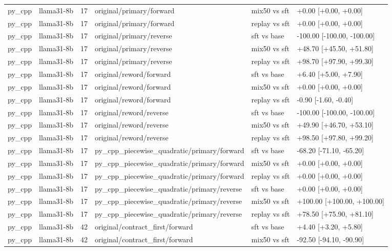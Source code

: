 \begin{table}[t]
\begin{tabular}{llllll}
py\_cpp & llama31-8b & 17 & original/primary/forward & mix50 vs sft & +0.00 [+0.00, +0.00] \\
py\_cpp & llama31-8b & 17 & original/primary/forward & replay vs sft & +0.00 [+0.00, +0.00] \\
py\_cpp & llama31-8b & 17 & original/primary/reverse & sft vs base & -100.00 [-100.00, -100.00] \\
py\_cpp & llama31-8b & 17 & original/primary/reverse & mix50 vs sft & +48.70 [+45.50, +51.80] \\
py\_cpp & llama31-8b & 17 & original/primary/reverse & replay vs sft & +98.70 [+97.90, +99.30] \\
py\_cpp & llama31-8b & 17 & original/reword/forward & sft vs base & +6.40 [+5.00, +7.90] \\
py\_cpp & llama31-8b & 17 & original/reword/forward & mix50 vs sft & +0.00 [+0.00, +0.00] \\
py\_cpp & llama31-8b & 17 & original/reword/forward & replay vs sft & -0.90 [-1.60, -0.40] \\
py\_cpp & llama31-8b & 17 & original/reword/reverse & sft vs base & -100.00 [-100.00, -100.00] \\
py\_cpp & llama31-8b & 17 & original/reword/reverse & mix50 vs sft & +49.90 [+46.70, +53.10] \\
py\_cpp & llama31-8b & 17 & original/reword/reverse & replay vs sft & +98.50 [+97.80, +99.20] \\
py\_cpp & llama31-8b & 17 & py\_cpp\_piecewise\_quadratic/primary/forward & sft vs base & -68.20 [-71.10, -65.20] \\
py\_cpp & llama31-8b & 17 & py\_cpp\_piecewise\_quadratic/primary/forward & mix50 vs sft & +0.00 [+0.00, +0.00] \\
py\_cpp & llama31-8b & 17 & py\_cpp\_piecewise\_quadratic/primary/forward & replay vs sft & +0.00 [+0.00, +0.00] \\
py\_cpp & llama31-8b & 17 & py\_cpp\_piecewise\_quadratic/primary/reverse & sft vs base & +0.00 [+0.00, +0.00] \\
py\_cpp & llama31-8b & 17 & py\_cpp\_piecewise\_quadratic/primary/reverse & mix50 vs sft & +100.00 [+100.00, +100.00] \\
py\_cpp & llama31-8b & 17 & py\_cpp\_piecewise\_quadratic/primary/reverse & replay vs sft & +78.50 [+75.90, +81.10] \\
py\_cpp & llama31-8b & 42 & original/contract\_first/forward & sft vs base & +4.40 [+3.20, +5.80] \\
py\_cpp & llama31-8b & 42 & original/contract\_first/forward & mix50 vs sft & -92.50 [-94.10, -90.90] \\

\end{tabular}
\end{table}
